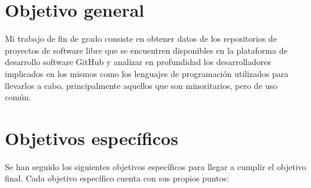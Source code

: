 \documentclass[a4paper, 12pt]{book}
\begin{document}
\section{Objetivo general} %
\label{sec:objetivo-general} %



Mi trabajo de fin de grado consiste en obtener datos de los repositorios de proyectos de software libre que se encuentren disponibles en la plataforma de desarrollo software GitHub y analizar en profundidad los desarrolladores implicados en los mismos como los lenguajes de programación utilizados para llevarlos a cabo, principalmente aquellos que son minoritarios, pero de uso común.

\section{Objetivos específicos}
\label{sec:objetivos-especificos}

Se han seguido los siguientes objetivos específicos para llegar a cumplir el objetivo final. Cada objetivo específico cuenta con sus propios puntos:
\end{document}

